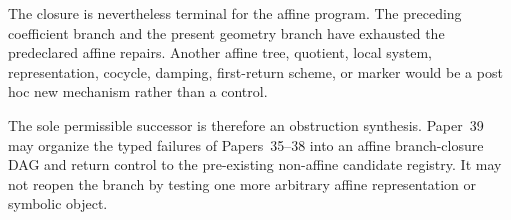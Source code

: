 The closure is nevertheless terminal for the affine program.  The preceding
coefficient branch and the present geometry branch have exhausted the
predeclared affine repairs.  Another affine tree, quotient, local system,
representation, cocycle, damping, first-return scheme, or marker would be a
post hoc new mechanism rather than a control.

The sole permissible successor is therefore an obstruction synthesis.
Paper~39 may organize the typed failures of Papers~35--38 into an affine
branch-closure DAG and return control to the pre-existing non-affine
candidate registry.  It may not reopen the branch by testing one more
arbitrary affine representation or symbolic object.
